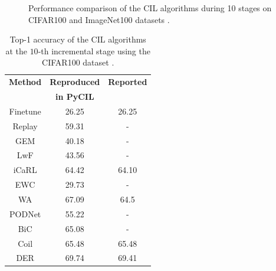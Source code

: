 \begin{figure}%
	\centering
	\hfill
	\caption{Performance comparison of the CIL algorithms during 10 stages on CIFAR100 and ImageNet100 datasets \cite{zhou2021pycil}.}%
	\label{fig:cil-comaprison}%
\end{figure}

\begin{table}
    \centering
    \begin{tabular}{c c c} 
     \hline
     \textbf{Method} & \textbf{Reproduced} & \textbf{Reported} \\
     & \textbf{in PyCIL}\\
     \hline
     \hline
     Finetune & 26.25& 26.25 \\

    Replay & 59.31 & - \\ 

    GEM & 40.18 & - \\ 

    LwF & 43.56 & - \\ 

    iCaRL & 64.42 & 64.10 \\ 

    EWC & 29.73 & - \\ 

    WA & 67.09 & 64.5 \\ 

    PODNet & 55.22 & - \\ 

    BiC & 65.08 & - \\ 

    Coil & 65.48 & 65.48 \\ 

    DER & 69.74 & 69.41 \\ 
    \hline
    \end{tabular}
    \caption{Top-1 accuracy of the CIL algorithms at the $10$-th incremental stage using the CIFAR100 dataset \cite{zhou2021pycil}.}
    \label{table:cil-results}
    \end{table}

